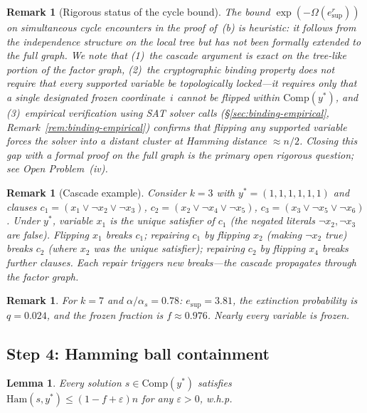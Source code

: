 \documentclass[11pt]{article}
\newtheorem{lemma}[theorem]{Lemma}
\newtheorem{remark}[theorem]{Remark}
\begin{document}
\begin{remark}[Rigorous status of the cycle bound]\label{rem:cycle-gap}
The bound $\exp(-\Omega(e_{\mathrm{sup}}^r))$ on simultaneous cycle encounters in the proof of~(b) is heuristic: it follows from the independence structure on the local tree but has not been formally extended to the full graph.  We note that (1)~the cascade argument is exact on the tree-like portion of the factor graph, (2)~the cryptographic binding property does not require that \emph{every} supported variable be topologically locked---it requires only that a single designated frozen coordinate~$i$ cannot be flipped within $\mathrm{Comp}(y^*)$, and (3)~empirical verification using SAT solver calls (\S\ref{sec:binding-empirical}, Remark~\ref{rem:binding-empirical}) confirms that flipping any supported variable forces the solver into a distant cluster at Hamming distance $\approx n/2$.  Closing this gap with a formal proof on the full graph is the primary open rigorous question; see Open Problem~(iv).
\end{remark}

\begin{remark}[Cascade example]
Consider $k = 3$ with $y^* = (1,1,1,1,1,1)$ and clauses $c_1 = (x_1 \vee \neg x_2 \vee \neg x_3)$, $c_2 = (x_2 \vee \neg x_4 \vee \neg x_5)$, $c_3 = (x_3 \vee \neg x_5 \vee \neg x_6)$.  Under $y^*$, variable $x_1$ is the unique satisfier of $c_1$ (the negated literals $\neg x_2, \neg x_3$ are false).  Flipping $x_1$ breaks $c_1$; repairing $c_1$ by flipping $x_2$ (making $\neg x_2$ true) breaks $c_2$ (where $x_2$ was the unique satisfier); repairing $c_2$ by flipping $x_4$ breaks further clauses.  Each repair triggers new breaks---the cascade propagates through the factor graph.
\end{remark}

\begin{remark}\label{rem:params}
For $k = 7$ and $\alpha/\alpha_s = 0.78$: $e_{\mathrm{sup}} = 3.81$, the extinction probability is $q = 0.024$, and the frozen fraction is $f \approx 0.976$.  Nearly every variable is frozen.
\end{remark}


\subsection{Step 4: Hamming ball containment}

\begin{lemma}\label{lem:hamming}
Every solution $s \in \mathrm{Comp}(y^*)$ satisfies $\mathrm{Ham}(s, y^*) \leq (1 - f + \varepsilon)n$ for any $\varepsilon > 0$, w.h.p.
\end{lemma}
\end{document}
